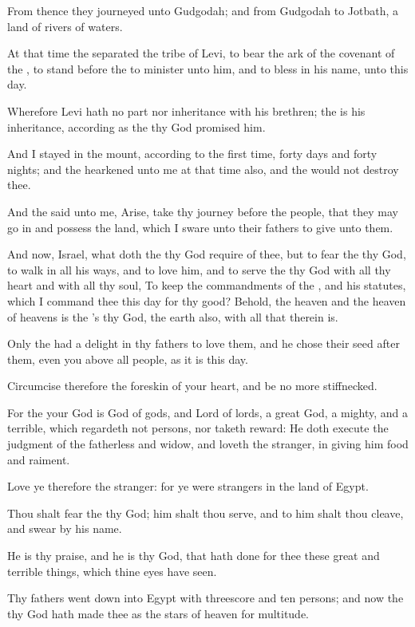\verse From thence they journeyed unto Gudgodah; and from Gudgodah to Jotbath, a land of rivers of waters.

\verse At that time the \LORD separated the tribe of Levi, to bear the ark of the covenant of the \LORD, to stand before the \LORD to minister unto him, and to bless in his name, unto this day.

\verse Wherefore Levi hath no part nor inheritance with his brethren; the \LORD is his inheritance, according as the \LORD thy God promised him.

\verse And I stayed in the mount, according to the first time, forty days and forty nights; and the \LORD hearkened unto me at that time also, and the \LORD would not destroy thee.

\verse And the \LORD said unto me, Arise, take thy journey before the people, that they may go in and possess the land, which I sware unto their fathers to give unto them.

\verse And now, Israel, what doth the \LORD thy God require of thee, but to fear the \LORD thy God, to walk in all his ways, and to love him, and to serve the \LORD thy God with all thy heart and with all thy soul, \verse To keep the commandments of the \LORD, and his statutes, which I command thee this day for thy good?  \verse Behold, the heaven and the heaven of heavens is the \LORD's thy God, the earth also, with all that therein is.

\verse Only the \LORD had a delight in thy fathers to love them, and he chose their seed after them, even you above all people, as it is this day.

\verse Circumcise therefore the foreskin of your heart, and be no more stiffnecked.

\verse For the \LORD your God is God of gods, and Lord of lords, a great God, a mighty, and a terrible, which regardeth not persons, nor taketh reward: \verse He doth execute the judgment of the fatherless and widow, and loveth the stranger, in giving him food and raiment.

\verse Love ye therefore the stranger: for ye were strangers in the land of Egypt.

\verse Thou shalt fear the \LORD thy God; him shalt thou serve, and to him shalt thou cleave, and swear by his name.

\verse He is thy praise, and he is thy God, that hath done for thee these great and terrible things, which thine eyes have seen.

\verse Thy fathers went down into Egypt with threescore and ten persons; and now the \LORD thy God hath made thee as the stars of heaven for multitude.


